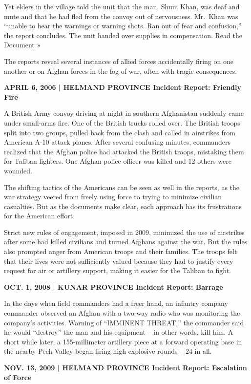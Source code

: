 ﻿\documentclass[12pt]{article}
\begin{document}
Yet elders in the village told the unit that the man, Shum Khan, was deaf and mute and that he had
fled from the convoy out of nervousness. Mr.~Khan was ``unable to hear the warnings or warning
shots. Ran out of fear and confusion,'' the report concludes. The unit handed over supplies in
compensation. Read the Document »

The reports reveal several instances of allied forces accidentally firing on one another or on
Afghan forces in the fog of war, often with tragic consequences.

\textbf{APRIL 6, 2006 | HELMAND PROVINCE Incident Report: Friendly Fire}

A British Army convoy driving at night in southern Afghanistan suddenly came under small-arms fire.
One of the British trucks rolled over. The British troops split into two groups, pulled back from
the clash and called in airstrikes from American A-10 attack planes. After several confusing
minutes, commanders realized that the Afghan police had attacked the British troops, mistaking them
for Taliban fighters. One Afghan police officer was killed and 12 others were wounded.

The shifting tactics of the Americans can be seen as well in the reports, as the war strategy veered
from freely using force to trying to minimize civilian casualties. But as the documents make clear,
each approach has its frustrations for the American effort.

Strict new rules of engagement, imposed in 2009, minimized the use of airstrikes after some had
killed civilians and turned Afghans against the war. But the rules also prompted anger from American
troops and their families. The troops felt that their lives were not sufficiently valued because
they had to justify every request for air or artillery support, making it easier for the Taliban to
fight.

\textbf{OCT. 1, 2008 | KUNAR PROVINCE Incident Report: Barrage}

In the days when field commanders had a freer hand, an infantry company commander observed an Afghan
with a two-way radio who was monitoring the company's activities. Warning of ``IMMINENT THREAT,''
the commander said he would ``destroy'' the man and his equipment -- in other words, kill him. A
short while later, a 155-millimeter artillery piece at a forward operating base in the nearby Pech
Valley began firing high-explosive rounds -- 24 in all.

\textbf{NOV. 13, 2009 | HELMAND PROVINCE Incident Report: Escalation of Force}
\end{document}
